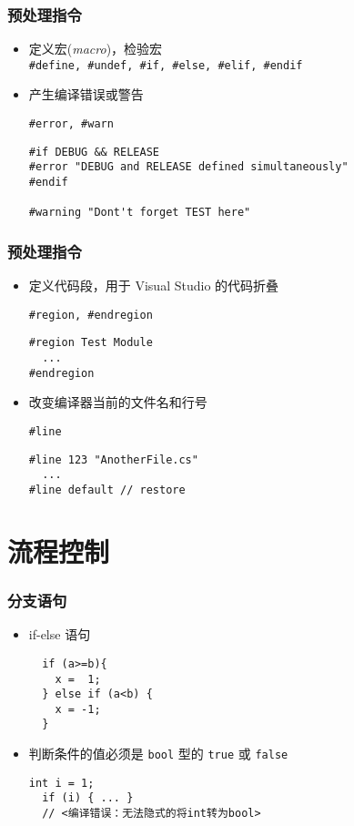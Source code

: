 \begin{frame}[fragile]
\frametitle{预处理指令}
\begin{itemize}
\item 定义宏(\textit{macro})，检验宏\\

\texttt{\#define, \#undef, \#if, \#else, \#elif, \#endif}

\item 产生编译错误或警告

\texttt{\#error, \#warn}

\begin{lstlisting}
#if DEBUG && RELEASE
#error "DEBUG and RELEASE defined simultaneously"
#endif

#warning "Dont't forget TEST here"
\end{lstlisting}
\end{itemize}
\end{frame}

\begin{frame}[fragile]
\frametitle{预处理指令}
\begin{itemize}
\item 定义代码段，用于 Visual Studio 的代码折叠

\texttt{\#region, \#endregion}

\begin{lstlisting}
#region Test Module
  ...
#endregion
\end{lstlisting}

\item 改变编译器当前的文件名和行号

\texttt{\#line}

\begin{lstlisting}
#line 123 "AnotherFile.cs"
  ...
#line default // restore
\end{lstlisting}
\end{itemize}

\end{frame}
\section{流程控制}

\begin{frame}[fragile]
\frametitle{分支语句}
  \begin{itemize}
  \item if-else 语句
\begin{lstlisting}
  if (a>=b){
    x =  1;
  } else if (a<b) {
    x = -1;
  }
\end{lstlisting}
  \item 判断条件的值必须是 \texttt{bool} 型的 \texttt{true} 或 \texttt{false}
\begin{lstlisting}[escapeinside=<>]
  int i = 1;
  if (i) { ... }
  // <编译错误：无法隐式的将int转为bool>
\end{lstlisting}
  \end{itemize}
\end{frame}

